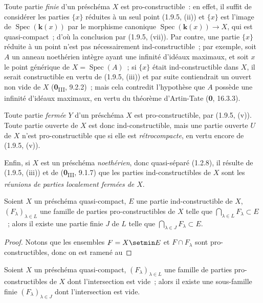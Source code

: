 \begin{examples}[1.9.6]
\label{IV.1.9.6-fr}
Toute partie \emph{finie} d'un préschéma $X$
est pro-constructible~: en effet, il suffit de considérer les parties
$\{x\}$ réduites à un seul point (1.9.5, (ii)) et $\{x\}$ est l'image de
$\operatorname{Spec}(\boldsymbol{k}(x))$ par le morphisme canonique
$\operatorname{Spec}(\boldsymbol{k}(x))\to X$, qui est quasi-compact~; d'où la conclusion
par (1.9.5, (vii)). Par contre, une partie $\{x\}$ réduite à un point n'est
pas nécessairement ind-constructible~; par exemple, soit $A$ un anneau
noethérien intègre ayant une infinité d'idéaux maximaux, et soit $x$ le point
générique de $X=\operatorname{Spec}(A)$~; si $\{x\}$ était ind-constructible
dans $X$, il serait constructible en vertu de (1.9.5, (iii)) et par suite
contiendrait un ouvert non vide de $X$ (\textbf{0}\textsubscript{III}, 9.2.2)~; mais
cela contredit l'hypothèse que $A$ possède une infinité d'idéaux maximaux, en
vertu du théorème d'Artin-Tate (\textbf{0}, 16.3.3).

Toute partie \emph{fermée} $Y$ d'un préschéma $X$ est pro-constructible, par
(1.9.5, (v)). Toute partie ouverte de $X$ est donc ind-constructible, mais
une partie ouverte $U$ de $X$ n'est pro-constructible que si elle est
\emph{rétrocompacte}, en vertu encore de (1.9.5, (v)).

Enfin, si $X$ est un préschéma \emph{noethérien}, donc quasi-séparé (1.2.8),
il résulte de (1.9.5, (iii)) et de (\textbf{0}\textsubscript{III}, 9.1.7) que les
parties ind-constructibles de $X$ sont les \emph{réunions de parties
localement fermées de $X$}.
\end{examples}

\begin{theorem}[1.9.7]
\label{IV.1.9.7-fr}
Soient $X$ un préschéma quasi-compact, $E$ une partie ind-constructible de
$X$, $(F_\lambda)_{\lambda\in L}$ une famille de parties pro-constructibles
de $X$ telle que $\bigcap_{\lambda\in L}F_\lambda\subset E$~; alors il existe
une partie finie $J$ de $L$ telle que
$\bigcap_{\lambda\in J}F_\lambda\subset E$.
\end{theorem}

\begin{proof}
Notons que les ensembles $F=X\setmin E$ et $F\cap F_\lambda$ sont
pro-constructibles, donc on est ramené au
\end{proof}

\begin{corollary}[1.9.8]
\label{IV.1.9.8-fr}
Soient $X$ un préschéma quasi-compact, $(F_\lambda)_{\lambda\in L}$ une
famille de parties pro-constructibles de $X$ dont l'intersection est vide~;
alors il existe une sous-famille finie $(F_\lambda)_{\lambda\in J}$ dont
l'intersection est vide.
\end{corollary}

